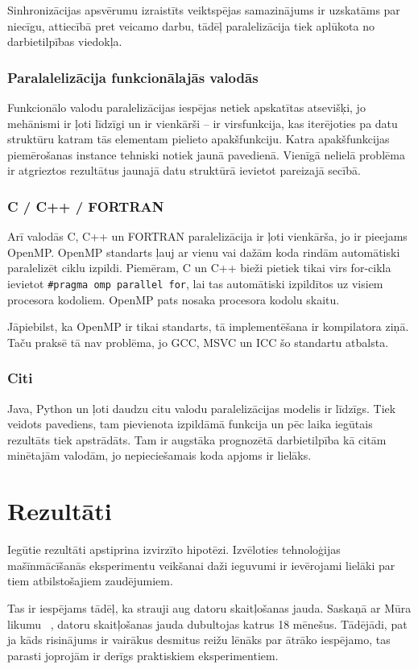 \documentclass{ludis}
\begin{document}
Sinhronizācijas apsvērumu izraistīts veiktspējas samazinājums ir uzskatāms par niecīgu, attiecībā pret veicamo darbu, tādēļ paralelizācija tiek aplūkota no darbietilpības viedokļa.

\subsection{Paralalelizācija funkcionālajās valodās}
Funkcionālo valodu paralelizācijas iespējas netiek apskatītas atsevišķi, jo mehānismi ir ļoti līdzīgi un ir vienkārši -- ir virsfunkcija, kas iterējoties pa datu struktūru katram tās elementam pielieto apakšfunkciju. Katra apakšfunkcijas piemērošanas instance tehniski notiek jaunā pavedienā. Vienīgā nelielā problēma ir atgrieztos rezultātus jaunajā datu struktūrā ievietot pareizajā secībā.

\subsection{C / C++ / FORTRAN}
Arī valodās C, C++ un FORTRAN paralelizācija ir ļoti vienkārša, jo ir pieejams OpenMP. OpenMP standarts ļauj ar vienu vai dažām koda rindām automātiski paralelizēt ciklu izpildi. Piemēram, C un C++ bieži pietiek tikai virs for-cikla ievietot \texttt{\#pragma omp parallel for}, lai tas automātiski izpildītos uz visiem procesora kodoliem. OpenMP pats nosaka procesora kodolu skaitu.

Jāpiebilst, ka OpenMP ir tikai standarts, tā implementēšana ir kompilatora ziņā. Taču praksē tā nav problēma, jo GCC, MSVC un ICC šo standartu atbalsta.

\subsection{Citi}
Java, Python un ļoti daudzu citu valodu paralelizācijas modelis ir līdzīgs. Tiek veidots pavediens, tam pievienota izpildāmā funkcija un pēc laika iegūtais rezultāts tiek apstrādāts. Tam ir augstāka prognozētā darbietilpība kā citām minētajām valodām, jo nepieciešamais koda apjoms ir lielāks.

\chapter{Rezultāti}
Iegūtie rezultāti apstiprina izvirzīto hipotēzi. Izvēloties tehnoloģijas mašīnmācīšanās eksperimentu veikšanai daži ieguvumi ir ievērojami lielāki par tiem atbilstošajiem zaudējumiem.

Tas ir iespējams tādēļ, ka strauji aug datoru skaitļošanas jauda. Saskaņā ar Mūra likumu ~\cite{moore_cramming}, datoru skaitļošanas jauda dubultojas katrus 18 mēnešus. Tādējādi, pat ja kāds risinājums ir vairākus desmitus reižu lēnāks par ātrāko iespējamo, tas parasti joprojām ir derīgs praktiskiem eksperimentiem.
\end{document}
